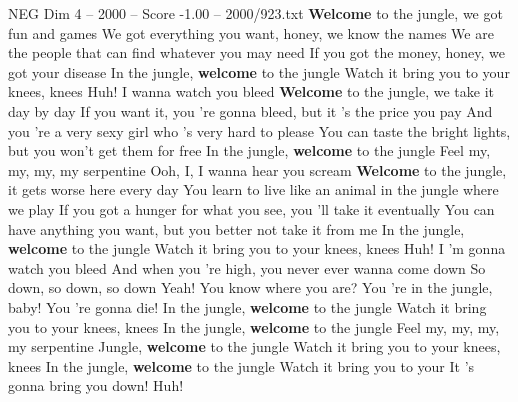 \begin{textsample}{NEG Dim 4 – 2000 – Score -1.00 – 2000/923.txt}  \label{ex:f4_neg_036}
\textbf{Welcome} to the jungle, we got fun and games We got everything you want, honey, we know the names We are the people that can find whatever you may need If you got the money, honey, we got your disease In the jungle, \textbf{welcome} to the jungle Watch it bring you to your knees, knees Huh!
I wanna watch you bleed \textbf{Welcome} to the jungle, we take it day by day If you want it, you 're gonna bleed, but it 's the price you pay And you 're a very sexy girl who 's very hard to please You can taste the bright lights, but you won't get them for free In the jungle, \textbf{welcome} to the jungle Feel my, my, my, my serpentine Ooh, I, I wanna hear you scream \textbf{Welcome} to the jungle, it gets worse here every day You learn to live like an animal in the jungle where we play If you got a hunger for what you see, you 'll take it eventually You can have anything you want, but you better not take it from me In the jungle, \textbf{welcome} to the jungle Watch it bring you to your knees, knees Huh!
I 'm gonna watch you bleed And when you 're high, you never ever wanna come down So down, so down, so down Yeah!
You know where you are?
You 're in the jungle, baby!
You 're gonna die!
In the jungle, \textbf{welcome} to the jungle Watch it bring you to your knees, knees In the jungle, \textbf{welcome} to the jungle Feel my, my, my, my serpentine Jungle, \textbf{welcome} to the jungle Watch it bring you to your knees, knees In the jungle, \textbf{welcome} to the jungle Watch it bring you to your It 's gonna bring you down!
Huh!

\end{textsample}
